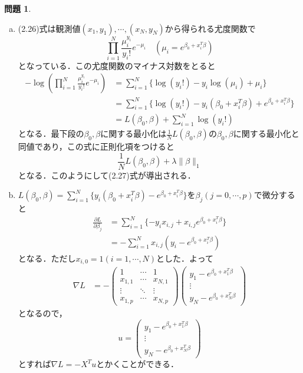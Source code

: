 \documentclass[titlepage]{jsarticle}
\theoremstyle{definition}
\newtheorem{Ex}{問題}
\theoremstyle{mystyle} %
\begin{document}
\begin{Ex}
\begin{enumerate}[(a)]
\item (2.26)式は観測値$(x_1,y_1),\cdots,(x_N,y_N)$から得られる尤度関数で
$$\prod_{i=1}^N\frac{\mu_i^{y_i}}{y_i!}e^{-\mu_i}\quad (\mu_i = e^{\beta_0+x_i^T \beta})$$
となっている．この尤度関数のマイナス対数をとると
\begin{align*}
-\log\left(\prod_{i=1}^N\frac{\mu_i^{y_i}}{y_i!}e^{-\mu_i}\right)&=\sum_{i=1}^N\{\log(y_i!)-y_i\log(\mu_i)+\mu_i\}\\
&=\sum_{i=1}^N\{\log(y_i!)-y_i(\beta_0+x_i^T\beta)+e^{\beta_0+x_i^T\beta}\}\\
&=L(\beta_0,\beta)+\sum_{i=1}^N \log(y_i!)
\end{align*}
となる．最下段の$\beta_0,\beta$に関する最小化は$\frac{1}{N}L(\beta_0,\beta)$の$\beta_0,\beta$に関する最小化と同値であり，この式に正則化項をつけると
$$\frac{1}{N}L(\beta_0,\beta)+\lambda\|\beta\|_1$$
となる．このようにして(2.27)式が導出される．\\

\item $L(\beta_0,\beta)=\sum_{i=1}^N\{y_i(\beta_0+x_i^T \beta)-e^{\beta_0+ x_i^T \beta}\}$を$\beta_j(j=0,\cdots,p)$で微分すると
\begin{align*}
\frac{\partial L}{\partial \beta_j} &=\sum_{i=1}^N \{-y_i x_{i,j}+x_{i,j}e^{\beta_0+ x_i^T \beta}\}\\
&=-\sum_{i=1}^N x_{i,j}(y_i-e^{\beta_0+ x_i^T \beta})
\end{align*}
となる．ただし$x_{i,0}=1(i=1,\cdots,N)$とした．よって
\begin{align*}
\nabla L&=-\begin{pmatrix}
1 & \cdots & 1\\
x_{1,1} & \cdots & x_{N,1}\\
\vdots & \ddots & \vdots \\
x_{1,p} & \cdots & x_{N,p}
\end{pmatrix}\left(\begin{array}{c}
y_1-e^{\beta_0+x_1^T \beta}\\
\vdots\\
y_N-e^{\beta_0+x_N^T \beta}
\end{array}\right)
\end{align*}
となるので，
$$u=\left(\begin{array}{c}
y_1-e^{\beta_0+x_1^T \beta}\\
\vdots\\
y_N-e^{\beta_0+x_N^T \beta}
\end{array}\right)$$
とすれば$\nabla L = -X^T u$とかくことができる．\\


\end{enumerate}
\end{Ex}
\end{document}
